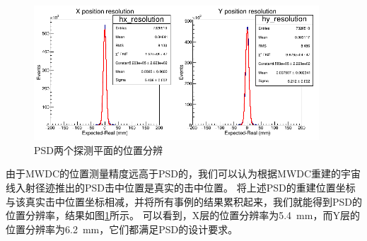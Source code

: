 \begin{figure}[htbp]
	\centering
	\includegraphics[width=0.95\textwidth]{chap/cosmic_ray/fig/pos_resolution.png}
	\caption{PSD两个探测平面的位置分辨}
	\label{fig:cosmic_ray:pos_resolution}
\end{figure}
由于MWDC的位置测量精度远高于PSD的，我们可以认为根据MWDC重建的宇宙线入射径迹推出的PSD击中位置是真实的击中位置。
将上述PSD的重建位置坐标与该真实击中位置坐标相减，并将所有事例的结果累积起来，我们就能得到PSD的位置分辨率，结果如图\ref{fig:cosmic_ray:pos_resolution}所示。
可以看到，X层的位置分辨率为\SI{5.4}{mm}，而Y层的位置分辨率为\SI{6.2}{mm}，它们都满足PSD的设计要求。

